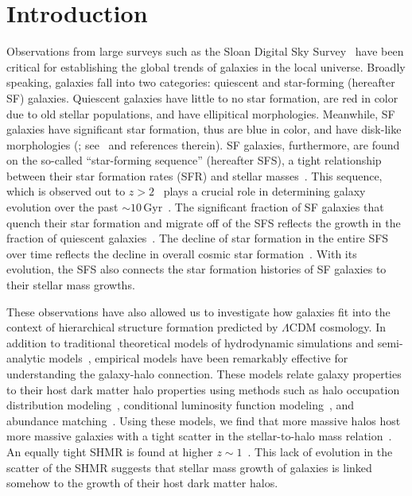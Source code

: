 \documentclass[12pt, letterpaper, preprint, tighten]{aastex62}
\newcommand{\edt}[1]{{\color{dred}{\bf} #1}}
\begin{document}
\section{Introduction}
Observations from large surveys such as the Sloan Digital Sky Survey~\citep[SDSS;][]{york2000}
have been critical for establishing the global trends of galaxies in
the local universe. Broadly speaking, galaxies fall into two categories:
quiescent and star-forming (hereafter SF) galaxies. Quiescent galaxies
have little to no star formation, are red in color
\edt{due to old stellar populations},
and have ellipitical
morphologies. Meanwhile, SF galaxies have significant star formation,
\edt{thus}
are blue in color, and have disk-like morphologies (\citealt{kauffmann2003, blanton2003, baldry2006, taylor2009, moustakas2013};
see~\citealt{blanton2009} and references therein).
SF galaxies, furthermore, are found on the so-called ``star-forming sequence''
(hereafter SFS), a tight relationship between their star formation rates (SFR)
and stellar masses~\citep[][see also Figure~\ref{fig:groupcat}]{noeske2007, daddi2007, salim2007, speagle2014, lee2015}.
This sequence, which is observed out to $z > 2$~\citep{wang2013, leja2015}
plays a crucial role in
\edt{determining}
galaxy evolution over the past ${\sim}10\,\mathrm{Gyr}$~\citep[see][for an alternative point of view]{kelson2014,abramson2016}.
The significant fraction of SF galaxies that quench their
star formation and migrate off of the SFS reflects the growth in the
fraction of quiescent galaxies~\citep{blanton2006, borch2006, bundy2006, moustakas2013}.
The decline of star formation in the entire SFS~\citep{lee2015, schreiber2015}
over time reflects the decline in overall cosmic star formation~\citep{hopkins2006, behroozi2013, madau2014}.
With its evolution, the SFS also connects the star formation histories of SF
galaxies to their stellar mass growths.

These observations have also allowed us to investigate how galaxies fit
into the context of hierarchical structure formation predicted by 
$\Lambda$CDM cosmology. In addition to traditional theoretical
models of hydrodynamic simulations and semi-analytic
models~\citep[see][for reviews]{silk2012, somerville2015},
empirical models 
\edt{have been remarkably effective} 
for understanding the galaxy-halo connection. These models relate galaxy
properties to their host dark matter halo properties using methods such as
halo occupation distribution modeling~\citep[HOD; \emph{e.g.}][]{zheng2007,zehavi2011,leauthaud2012,parejko2013,zu2015},
\edt{conditional} luminosity function modeling~\citep[\emph{e.g.}][]{yang2009}, and abundance
matching~\citep[\emph{e.g.}][]{kravtsov2004, vale2006, conroy2009, moster2013, reddick2013}.
Using these models, we find that more massive halos host more
massive galaxies with a tight scatter in the stellar-to-halo
mass relation~\citep[hereafter SHMR;][]{mandelbaum2006a, conroy2007, more2011, leauthaud2012, tinker2013, velander2014, han2015, zu2015, gu2016, lange2018a}. 
An equally tight SHMR is found at higher
$z\sim1$~\citep{leauthaud2012, tinker2013, patel2015}. This lack of
evolution in the scatter of the SHMR suggests that stellar
mass growth of galaxies is linked somehow to the growth
of their host dark matter halos.
\end{document}
